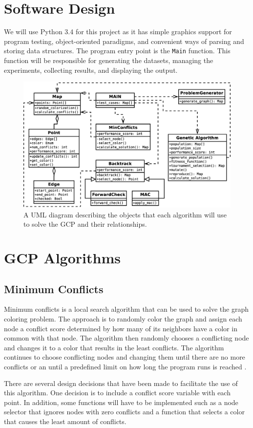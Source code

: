 \documentclass{article}
\begin{document}
\begin{multicols}{2}
\section{Software Design}
We will use Python 3.4 for this project as it has simple graphics support for program testing, object-oriented paradigms, and convenient ways of parsing and storing data structures. The program entry point is the \texttt{Main} function. This function will be responsible for generating the datasets, managing the experiments, collecting results, and displaying the output.
\begin{figure}[H]
	\centering
	\includegraphics[width=\linewidth]{images/AI_UML_Project_1}
	\caption{A UML diagram describing the objects that each algorithm will use to solve the GCP and their relationships.}
	\label{uml}
\end{figure}
\section{GCP Algorithms}
\subsection{Minimum Conflicts}
Minimum conflicts is a local search algorithm that can be used to solve the graph coloring problem. The approach is to randomly color the graph and assign each node a conflict score determined by how many of its neighbors have a color in common with that node. The algorithm then randomly chooses a conflicting node and changes it to a color that results in the least conflicts. The algorithm continues to choose conflicting nodes and changing them until there are no more conflicts or an until a predefined limit on how long the program runs is reached \cite{ai}. \par
There are several design decisions that have been made to facilitate the use of this algorithm. One decision is to include a conflict score variable with each point. In addition, some functions will have to be implemented such as a node selector that ignores nodes with zero conflicts and a function that selects a color that causes the least amount of conflicts.

\end{multicols}
\end{document}
